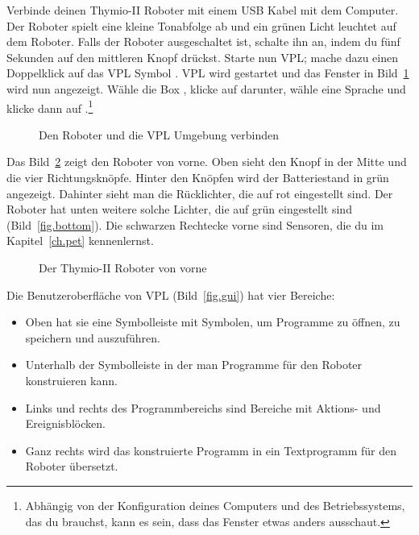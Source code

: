 

Verbinde deinen Thymio-II Roboter mit einem USB Kabel mit dem Computer. Der
Roboter spielt eine kleine Tonabfolge ab und  ein grünen Licht leuchtet auf dem
Roboter. Falls der Roboter ausgeschaltet ist, schalte ihn an, indem du fünf
Sekunden auf den mittleren Knopf drückst. Starte nun VPL; mache dazu einen
Doppelklick auf das VPL Symbol . VPL wird gestartet und das
Fenster in Bild~\ref{fig.connect} wird nun angezeigt. Wähle die Box
, klicke auf  darunter, wähle eine
Sprache und klicke dann auf .\footnote{Abhängig von der
Konfiguration deines Computers und des Betriebssystems, das du brauchst, kann es
sein, dass das Fenster etwas anders ausschaut.}


\begin{figure}
\begin{center}
\caption{Den Roboter und die VPL Umgebung verbinden}\label{fig.connect}
\end{center}
\end{figure} 


Das Bild~\ref{fig.front} zeigt den Roboter von vorne. Oben sieht den Knopf in
der Mitte und die vier Richtungsknöpfe. Hinter den Knöpfen wird der
Batteriestand in grün angezeigt. Dahinter sieht man die Rücklichter, die auf
rot eingestellt sind. Der Roboter hat unten weitere solche Lichter, die auf
grün eingestellt sind (Bild~\ref{fig.bottom}). Die schwarzen Rechtecke vorne
sind Sensoren, die du im Kapitel~\ref{ch.pet} kennenlernst.

\begin{figure}
\begin{center}
\caption{Der Thymio-II Roboter von vorne}\label{fig.front}
\end{center}
\end{figure} 

\clearpage


Die Benutzeroberfläche von VPL (Bild~\ref{fig.gui}) hat vier Bereiche:

\begin{itemize}
\item Oben hat sie eine Symbolleiste mit Symbolen, um Programme zu öffnen, zu
    speichern und auszuführen.
\item Unterhalb der Symbolleiste in der man Programme für den Roboter
    konstruieren kann.
\item Links und rechts des Programmbereichs sind Bereiche mit Aktions- und
    Ereignisblöcken.
\item Ganz rechts wird das konstruierte Programm in ein Textprogramm für den
    Roboter übersetzt.
\end{itemize}

